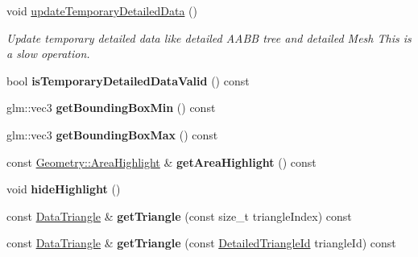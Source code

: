 \begin{DoxyCompactItemize}
void \mbox{\hyperlink{classpepr3d_1_1_geometry_ad25fda5afe4c73c0fd9dbd4bf77952b1}{update\+Temporary\+Detailed\+Data}} ()
\begin{DoxyCompactList}\small\item\em Update temporary detailed data like detailed A\+A\+BB tree and detailed Mesh This is a slow operation. \end{DoxyCompactList}\item 
\mbox{\label{classpepr3d_1_1_geometry_a995a46878723dd2108960ad3163097b5}} 
bool {\bfseries is\+Temporary\+Detailed\+Data\+Valid} () const
\item 
\mbox{\label{classpepr3d_1_1_geometry_a672f356239790e119faf9fedac88826c}} 
glm\+::vec3 {\bfseries get\+Bounding\+Box\+Min} () const
\item 
\mbox{\label{classpepr3d_1_1_geometry_a99b2474e709c4965c4936c69c094b02b}} 
glm\+::vec3 {\bfseries get\+Bounding\+Box\+Max} () const
\item 
\mbox{\label{classpepr3d_1_1_geometry_ad37135e84945f5e02ee7135a7fa57429}} 
const \mbox{\hyperlink{structpepr3d_1_1_geometry_1_1_area_highlight}{Geometry\+::\+Area\+Highlight}} \& {\bfseries get\+Area\+Highlight} () const
\item 
\mbox{\label{classpepr3d_1_1_geometry_a671769c7156f27e4666d4db982e30ec6}} 
void {\bfseries hide\+Highlight} ()
\item 
\mbox{\label{classpepr3d_1_1_geometry_a7246a4afe6b3e0624e3b22f7b28aea9e}} 
const \mbox{\hyperlink{classpepr3d_1_1_data_triangle}{Data\+Triangle}} \& {\bfseries get\+Triangle} (const size\+\_\+t triangle\+Index) const
\item 
\mbox{\label{classpepr3d_1_1_geometry_a93214e41fbec98dd0e144af5643611e8}} 
const \mbox{\hyperlink{classpepr3d_1_1_data_triangle}{Data\+Triangle}} \& {\bfseries get\+Triangle} (const \mbox{\hyperlink{structpepr3d_1_1_detailed_triangle_id}{Detailed\+Triangle\+Id}} triangle\+Id) const
\item 
\mbox{\label{classpepr3d_1_1_geometry_a58031509df8f5a9a83e98106cc37af4a}} 

\end{DoxyCompactItemize}

